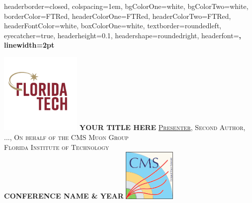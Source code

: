 \documentclass[landscape,a0paper,fontscale=0.42]{baposter} %
\begin{document}
\begin{poster}{
	headerborder=closed, %
	colspacing=1em, %
	bgColorOne=white, %
	bgColorTwo=white, %
	borderColor=FTRed, %
	headerColorOne=FTRed, %
	headerColorTwo=FTRed, %
	headerFontColor=white, %
	boxColorOne=white, %
	textborder=roundedleft, %
	eyecatcher=true, %
	headerheight=0.1\textheight, %
	headershape=roundedright, %
	headerfont=\Large\bf\textsc, %
	linewidth=2pt %
}

{\includegraphics[height=3.9cm]{FloridaTechNewLogo.png}} %
{\bf\textsc{\Huge{YOUR TITLE HERE}}} %
{\LARGE{\textsc{\underline{Presenter}, Second Author, ..., On behalf of the CMS Muon Group\\ Florida Institute of Technology}}\\

\textsc{\textbf{\textcolor{FTRed}{\Large{CONFERENCE NAME \& YEAR}}}}
} %
{\includegraphics[height=2.5cm]{CMS_logo_May2014.pdf}} %



\end{poster}
\end{document}
